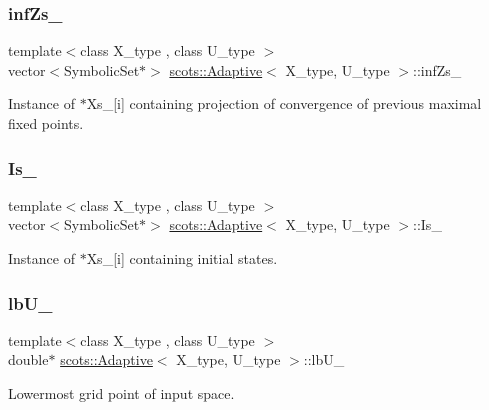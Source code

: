 \subsubsection{\texorpdfstring{inf\+Zs\+\_\+}{infZs\_}}
{\footnotesize\ttfamily template$<$class X\+\_\+type , class U\+\_\+type $>$ \\
vector$<$Symbolic\+Set$\ast$$>$ \hyperlink{classscots_1_1Adaptive}{scots\+::\+Adaptive}$<$ X\+\_\+type, U\+\_\+type $>$\+::inf\+Zs\+\_\+}

Instance of $\ast$\+Xs\+\_\+\mbox{[}i\mbox{]} containing projection of convergence of previous maximal fixed points. \mbox{\label{classscots_1_1Adaptive_a1421430af54b816e57d7cc4db6f1a83d}} 
\subsubsection{\texorpdfstring{Is\+\_\+}{Is\_}}
{\footnotesize\ttfamily template$<$class X\+\_\+type , class U\+\_\+type $>$ \\
vector$<$Symbolic\+Set$\ast$$>$ \hyperlink{classscots_1_1Adaptive}{scots\+::\+Adaptive}$<$ X\+\_\+type, U\+\_\+type $>$\+::Is\+\_\+}

Instance of $\ast$\+Xs\+\_\+\mbox{[}i\mbox{]} containing initial states. \mbox{\label{classscots_1_1Adaptive_aebaf5b4abaa33f4494491cbe67b42b80}} 
\subsubsection{\texorpdfstring{lb\+U\+\_\+}{lbU\_}}
{\footnotesize\ttfamily template$<$class X\+\_\+type , class U\+\_\+type $>$ \\
double$\ast$ \hyperlink{classscots_1_1Adaptive}{scots\+::\+Adaptive}$<$ X\+\_\+type, U\+\_\+type $>$\+::lb\+U\+\_\+}

Lowermost grid point of input space. \mbox{\label{classscots_1_1Adaptive_a6018fcd45bd81cc0073f0bd1f375829d}} 
